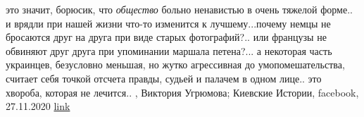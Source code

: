 это значит, борюсик, что \emph{общество} больно ненавистью в очень
тяжелой форме.. и врядли при нашей жизни что-то изменится к лучшему...почему
немцы не бросаются друг на друга при виде старых фотографий?.. или французы не
обвиняют друг друга при упоминании маршала петена?... а некоторая часть
украинцев, безусловно меньшая, но жутко агрессивная до умопомешательства,
считает себя точкой отсчета правды, судьей и палачем в одном лице.. это хвороба,
которая не лечится..
, Виктория Угрюмова; Киевские Истории, facebook, 27.11.2020
\href{https://www.facebook.com/groups/story.kiev.ua/posts/1525338420996287}{link}
